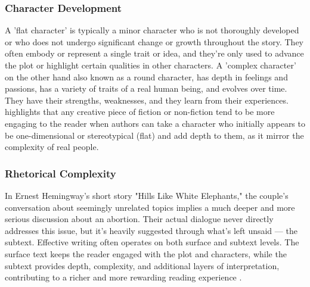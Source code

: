 \subsubsection{Character Development}
A 'flat character' is typically a minor character who is not thoroughly developed or who does not undergo significant change or growth throughout the story. They often embody or represent a single trait or idea, and they're only used to advance the plot or highlight certain qualities in other characters. A 'complex character' on the other hand also known as a round character, has depth in feelings and passions, has a variety of traits of a real human being, and evolves over time. They have their strengths, weaknesses, and they learn from their experiences. \cite{forster1927aspects,fishelov1990types,currie1990nature} highlights that any creative piece of fiction or non-fiction tend to be more engaging to the reader when authors can take a character who initially appears to be one-dimensional or stereotypical (flat) and add depth to them, as it mirror the complexity of real people.
\subsubsection{Rhetorical Complexity}
In Ernest Hemingway's short story "Hills Like White Elephants," the couple's conversation about seemingly unrelated topics implies a much deeper and more serious discussion about an abortion. Their actual dialogue never directly addresses this issue, but it's heavily suggested through what's left unsaid — the subtext. Effective writing often operates on both surface and subtext levels. The surface text keeps the reader engaged with the plot and characters, while the subtext provides depth, complexity, and additional layers of interpretation, contributing to a richer and more rewarding reading experience \cite{kochis2007baxter,phelan1996narrative}.

